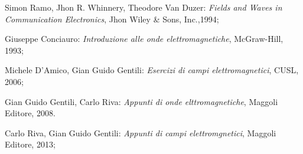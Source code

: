 \begin{thebibliography}{}


	Simon Ramo, Jhon R. Whinnery, Theodore Van Duzer: \textit{Fields and Waves in Communication Electronics}, Jhon Wiley \& Sons, Inc.,1994;


	Giuseppe Conciauro: \textit{Introduzione alle onde elettromagnetiche}, McGraw-Hill, 1993;



	Michele D'Amico, Gian Guido Gentili: \textit{Esercizi di campi elettromagnetici}, CUSL, 2006;


	Gian Guido Gentili, Carlo Riva: \textit{Appunti di onde elttromagnetiche}, Maggoli Editore, 2008.


	Carlo Riva, Gian Guido Gentili: \textit{Appunti di campi elettromgnetici}, Maggoli Editore, 2013;





\end{thebibliography}



        \newpage
        \null 
        \thispagestyle{empty} 
        \newpage
        
        \newpage
        \null 
        \thispagestyle{empty} 
        \newpage
